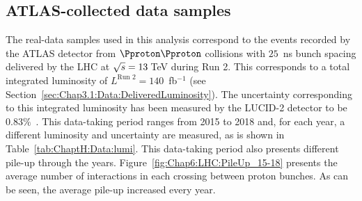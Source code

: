 \subsection{ATLAS-collected data samples}
\label{sec:ChaptH:Data_and_MC:Data}
The real-data samples used in this analysis correspond to the events
recorded by the ATLAS detector from $\Pproton\Pproton$ collisions with $25$~ns bunch spacing
delivered by the LHC at $\sqrt{s}=13\,$TeV during Run 2. 
This corresponds to a total integrated luminosity of $L^{\text{Run 2}} = 140$~fb$^{-1}$ (see Section~\ref{sec:Chap3.1:Data:DeliveredLuminosity}).
The uncertainty corresponding to this integrated luminosity has been measured by the LUCID-2
detector to be $0.83\%$~\cite{ATLAS:2022hro, Avoni:2018iuv}. This data-taking period ranges from 2015 to 2018 and, for each year,
a different luminosity and uncertainty are measured, as is shown in Table~\ref{tab:ChaptH:Data:lumi}.
This data-taking period also presents different pile-up through the years. 
Figure~\ref{fig:Chap6:LHC:PileUp_15-18} presents the average number of interactions
in each crossing between proton bunches. As can be seen, the average pile-up increased
every year. 


